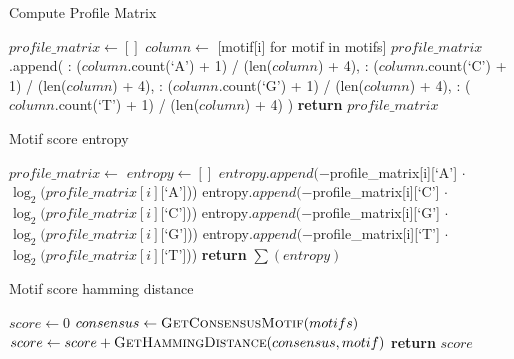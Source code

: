 \documentclass{article}
\begin{document}
\begin{algorithm}
\caption{Compute Profile Matrix}
\begin{algorithmic}[1]
    \State $profile\_matrix \gets []$
        \State $column \gets$ [motif[i] for motif in motifs]
        \State $profile\_matrix$.append({
        : ($column$.count({`A'}) + 1) / (len($column$) + 4),
        : ($column$.count({`C'}) + 1) / (len($column$) + 4),
        : ($column$.count({`G'}) + 1) / (len($column$) + 4),
        : ($column$.count({`T'}) + 1) / (len($column$) + 4)
        \State })
    \EndFor
    \State \textbf{return} $profile\_matrix$
\EndFunction
\end{algorithmic}
\end{algorithm}

\begin{algorithm}
\caption{Motif score entropy}
\begin{algorithmic}[1]
    \State $profile\_matrix \gets$ 
    \State $entropy \gets []$
            \State $entropy.append(-$profile\_matrix[i][{`A'}] $\cdot$ $\log_2(profile\_matrix[i][${`A'}$]$))
        \EndIf
            \State entropy$.append(-$profile\_matrix[i][{`C'}] $\cdot$ $\log_2(profile\_matrix[i][${`C'}$]$))
        \EndIf
            \State $ $entropy$.append(-$profile\_matrix[i][{`G'}] $\cdot$ $\log_2(profile\_matrix[i][${`G'}$]$))
        \EndIf
            \State $ $entropy$.append(-$profile\_matrix[i][{`T'}] $\cdot$ $\log_2(profile\_matrix[i][${`T'}$]$))
        \EndIf
    \EndFor
    \State \textbf{return} $\sum(entropy)$
\EndFunction
\end{algorithmic}
\end{algorithm}

\begin{algorithm}
\caption{Motif score hamming distance}
\begin{algorithmic}[1]
    \State $score \gets 0$
    \State $consensus \gets \Call{GetConsensusMotif}{motifs}$
        \State $score \gets score + \Call{GetHammingDistance}{consensus, motif}$
    \EndFor
    \State \textbf{return} $score$
\EndFunction
\end{algorithmic}
\end{algorithm}
\end{document}
